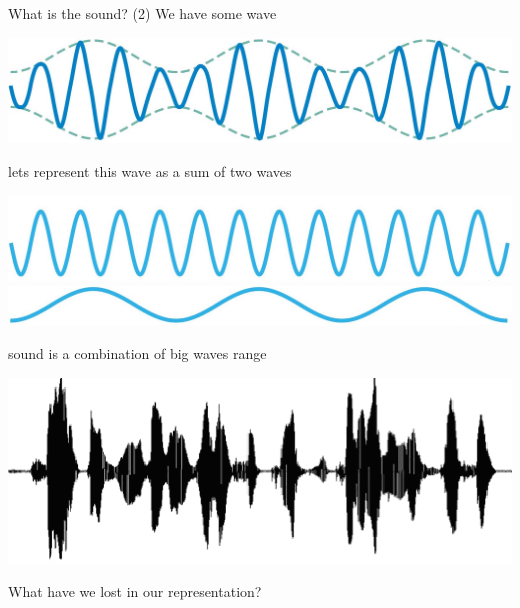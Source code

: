 \documentclass{beamer}
\begin{document}
\begin{frame}{What is the sound? (2)} 
	We have some wave 
	
		\begin{center}
			\includegraphics[scale=0.1]{img/wave1}
		\end{center}
		
	lets represent this wave as a sum of two waves 
	
		\begin{center}
			\includegraphics[scale=0.1]{img/wave2}
			\includegraphics[scale=0.1]{img/wave3}
		\end{center}
	
	sound is a combination of big waves range
	
		\begin{center}
			\includegraphics[scale=0.4]{img/sound_}
		\end{center}
	
	\begin{center}
		What have we lost in our representation?
	\end{center}	
\end{frame}
\end{document}
